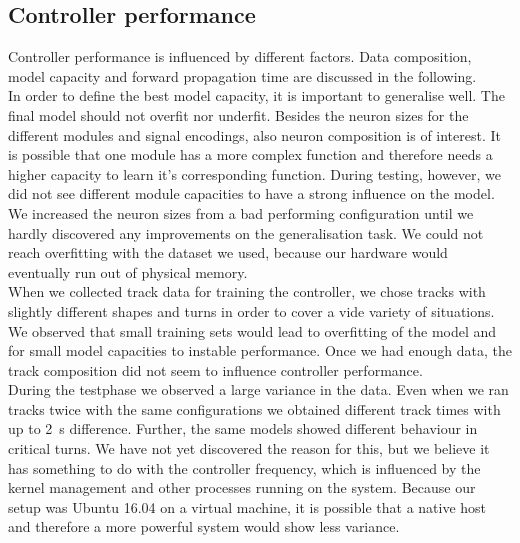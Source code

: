 \documentclass[10pt,a4paper,twoside,journal]{IEEEtran}
\begin{document}
\subsection{Controller performance}
Controller performance is influenced by different factors. Data composition, model capacity and forward propagation time are discussed in the following. \\
In order to define the best model capacity, it is important to generalise well. The final model should not overfit nor underfit. Besides the neuron sizes for the different modules and signal encodings, also neuron composition is of interest. It is possible that one module has a more complex function and therefore needs a higher capacity to learn it's corresponding function. During testing, however, we did not see different module capacities to have a strong influence on the model. We increased the neuron sizes from a bad performing configuration until we hardly discovered any improvements on the generalisation task. We could not reach overfitting with the dataset we used, because our hardware would eventually run out of physical memory.\\
When we collected track data for training the controller, we chose tracks with slightly different shapes and turns in order to cover a vide variety of situations. We observed that small training sets would lead to overfitting of the model and for small model capacities to instable performance. Once we had enough data, the track composition did not seem to influence controller performance. \\
During the testphase we observed a large variance in the data. Even when we ran tracks twice with the same configurations we obtained different track times with up to \SI{2}{\second} difference. Further, the same models showed different behaviour in critical turns. We have not yet discovered the reason for this, but we believe it has something to do with the controller frequency, which is influenced by the kernel management and other processes running on the system. Because our setup was Ubuntu 16.04 on a virtual machine, it is possible that a native host and therefore a more powerful system would show less variance. \\
\end{document}
